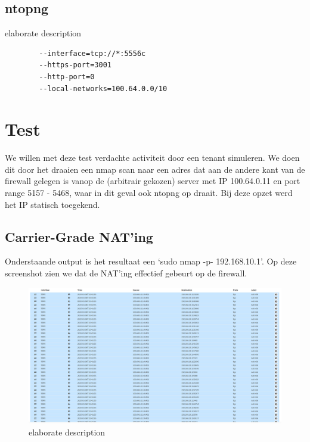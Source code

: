 \subsection{ntopng}
\begin{listing}[!htbp]
    \caption[ntopng configuration]{elaborate description}
    \label{code:ntopngConf}

    \begin{verbatim}
        --interface=tcp://*:5556c
        --https-port=3001
        --http-port=0
        --local-networks=100.64.0.0/10
    \end{verbatim}
\end{listing}

\section{Test}
We willen met deze test verdachte activiteit door een tenant simuleren. We doen dit door het draaien een nmap scan naar een adres dat aan de andere kant van de firewall gelegen is vanop de (arbitrair gekozen) server met IP 100.64.0.11 en port range 5157 - 5468, waar in dit geval ook ntopng op draait. Bij deze opzet werd het IP statisch toegekend.

\subsection{Carrier-Grade NAT’ing}
Onderstaande output is het resultaat een ‘sudo nmap -p- 192.168.10.1’. Op deze screenshot zien we dat de NAT’ing effectief gebeurt op de firewall.

\begin{figure}[H]
    \includegraphics[width=\textwidth]{graphics/nmap_nat_table.PNG}
    \caption[OPNsense CGN regels in werking deel 1]{elaborate description}
    \label{fig:FirewallGCNWorksA}
\end{figure}

